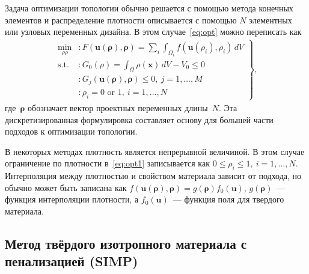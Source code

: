 Задача оптимизации топологии обычно решается с помощью метода конечных элементов и распределение плотности описывается с помощью $N$ элементных или узловых переменных дизайна. В этом случае~\ref{eq:opt} можно переписать как
\begin{equation}\label{eq:opt1}
	\begin{aligned} 
	\left.
	\begin{array}{rl}
		\min\limits_{\rho\rho} & : F(\mathbf{u}(\boldsymbol{\rho}), \boldsymbol{\rho}) = \sum_{i} \int_{\Omega_{i}} f(\mathbf{u}(\rho_{i}), \rho_{i}) \, dV \\
		\text{s.t.} & : G_0(\rho) = \int_{\Omega} \rho(\mathbf{x}) \, dV - V_0 \leq 0 \\
		& : G_{j}(\mathbf{u}(\boldsymbol{\rho}), \boldsymbol{\rho}) \leq 0, \ j = 1, \ldots, M \\
		& : \rho_{i} = 0 \text{ or } 1, \ i = 1, \ldots, N
	\end{array} \right\},
\end{aligned} 
\end{equation}
где~$\boldsymbol{\rho}$ обозначает вектор проектных переменных длины~$N$. Эта дискретизированная формулировка составляет основу для большей части подходов к оптимизации топологии.

В некоторых методах плотность является непрерывной величиной. В этом случае ограничение по плотности в~\ref{eq:opt1} записывается как $0 \leq \rho_{i} \leq 1, \ i=1,\ldots,N$.
Интерполяция между плотностью и свойством материала зависит от подхода, но обычно может быть записана как $f(\mathbf{u}(\boldsymbol{\rho}),\boldsymbol{\rho}) = g(\boldsymbol{\rho})f_0(\mathbf{u})$,  $g(\boldsymbol{\rho})$~--- функция интерполяции плотности, а $f_0(\mathbf{u})$~--- функция поля для твердого материала.




\subsection{Метод твёрдого изотропного материала с пенализацией (SIMP)}



